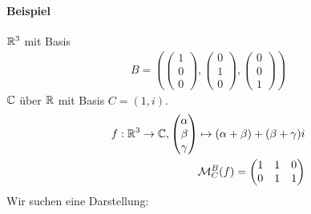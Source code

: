 \paragraph{Beispiel}
$\mathbb{R}^3$ mit Basis 
\begin{align}
B = (\begin{pmatrix}1 \\ 0 \\ 0\end{pmatrix}, \begin{pmatrix} 0 \\ 1 \\ 0\end{pmatrix}, \begin{pmatrix} 0 \\ 0 \\ 1\end{pmatrix})
\end{align}
$\mathbb{C}$ über $\mathbb{R}$ mit Basis $C = (1, i)$.
\begin{align}
f : \mathbb{R}^3 \rightarrow \mathbb{C}, \begin{pmatrix} \alpha \\ \beta \\ \gamma \end{pmatrix} \mapsto (\alpha + \beta) + (\beta + \gamma)i \\
\mathcal{M}_{C}^{B}(f) = \begin{pmatrix}1 & 1 & 0 \\ 0 & 1 & 1\end{pmatrix}
\end{align}
Wir suchen eine Darstellung:
